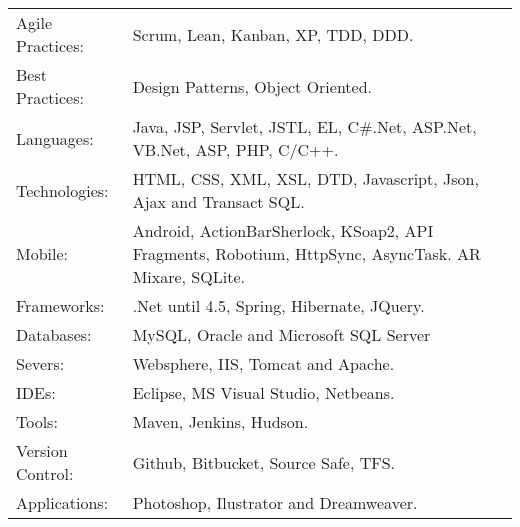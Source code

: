 \documentclass[a4paper, oneside, final]{scrartcl}
\begin{document}
\begin{center}
\begin{tabularx}{0.97\linewidth}{p{3.0cm}X}
Agile Practices: & Scrum, Lean, Kanban, XP, TDD, DDD.\\
Best Practices:  & Design Patterns, Object Oriented.\\
Languages:       & Java, JSP, Servlet, JSTL, EL, C\#.Net, ASP.Net, VB.Net, ASP, PHP, C/C++.\\
Technologies:    & HTML, CSS, XML, XSL, DTD, Javascript, Json, Ajax and Transact SQL.\\
Mobile:          & Android, ActionBarSherlock, KSoap2, API Fragments, Robotium, HttpSync, AsyncTask. AR Mixare, SQLite.\\
Frameworks:      & .Net until 4.5, Spring, Hibernate, JQuery.\\
Databases:       & MySQL, Oracle and Microsoft SQL Server \\
Severs:          & Websphere, IIS, Tomcat and Apache.\\
IDEs:            & Eclipse, MS Visual Studio, Netbeans.\\
Tools:			 & Maven, Jenkins, Hudson.\\
Version Control: & Github, Bitbucket, Source Safe, TFS.\\
Applications:    & Photoshop, Ilustrator and Dreamweaver.\\
\end{tabularx}


\end{center}
\end{document}
